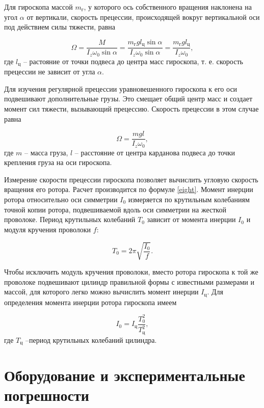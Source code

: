 \documentclass[a4paper,12pt]{article} %
\begin{document}
Для гироскопа массой $ m_\text{г} $, у которого ось собственного вращения наклонена на угол $ \alpha $ от вертикали, скорость прецессии, происходящей вокруг вертикальной оси под действием силы тяжести, равна

\begin{equation}
\Omega = \frac{M}{I_z\omega_0\sin \alpha} = \frac{m_\text{г}gl_\text{ц}\sin\alpha}{I_z\omega_0\sin\alpha} = \frac{m_\text{г}gl_\text{ц}}{I_z\omega_0},
\end{equation}
где $ l_\text{ц} $ -- растояние от точки подвеса до центра масс гироскопа, т. е. скорость прецессии не зависит от угла $ \alpha $.

Для изучения регулярной прецессии уравновешенного гироскопа к его оси подвешивают дополнительные грузы. Это смещает общий центр масс и создает момент сил тяжести, вызывающий прецессию. Скорость прецессии в этом случае равна

\begin{equation}
\Omega = \frac{mgl}{I_z\omega_0},
\label{eight}
\end{equation}
где $ m $ -- масса груза, $ l $ -- расстояние от центра карданова подвеса до точки крепления груза на оси гироскопа.

Измерение скорости прецессии гироскопа позволяет вычислить угловую скорость вращения его ротора. Расчет производится по формуле \eqref{eight}. Момент инерции ротора относительно оси симметрии $ I_0 $ измеряется по крутильным колебаниям точной копии ротора, подвешиваемой вдоль оси симметрии на жесткой проволоке. Период крутильных колебаний $ T_0 $ зависит от момента инерции $ I_0 $ и модуля кручения проволоки $ f $:

\begin{equation}
T_0 = 2\pi\sqrt{\frac{I_0}{f}}.
\label{nine}
\end{equation} 

Чтобы исключить модуль кручения проволоки, вместо ротора гироскопа к той же проволоке подвешивают цилиндр правильной формы с известными размерами и массой, для которого легко можно вычислить момент инерции $ I_\text{ц} $. Для определения момента инерции ротора гироскопа имеем 

\begin{equation}
I_0=I_\text{ц}\frac{T_0^2}{T_\text{ц}^2},
\label{ten}
\end{equation}
где $ T_\text{ц} $ --период крутильных колебаний цилиндра.

\section{Оборудование и экспериментальные погрешности}
\end{document}
